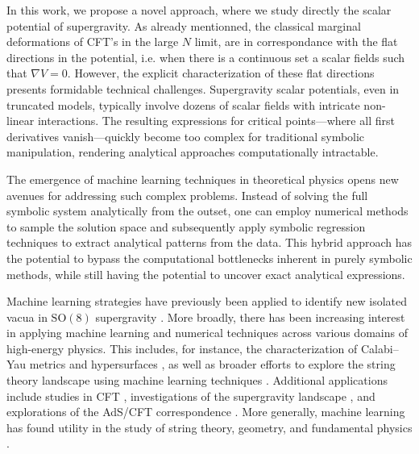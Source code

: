 \documentclass[11pt,a4paper]{article}
\begin{document}
In this work, we propose a novel approach, where we study directly the scalar potential of supergravity. As already mentionned, the classical marginal deformations of CFT's in the large $N$ limit, are in correspondance with the flat directions in the potential, i.e. when there is a continuous set a scalar fields such that $\nabla V = 0$. However, the explicit characterization of these flat directions presents formidable technical challenges. Supergravity scalar potentials, even in truncated models, typically involve dozens of scalar fields with intricate non-linear interactions. The resulting expressions for critical points—where all first derivatives vanish—quickly become too complex for traditional symbolic manipulation, rendering analytical approaches computationally intractable. 

The emergence of machine learning techniques in theoretical physics opens new avenues for addressing such complex problems. Instead of solving the full symbolic system analytically from the outset, one can employ numerical methods to sample the solution space and subsequently apply symbolic regression techniques to extract analytical patterns from the data. This hybrid approach has the potential to bypass the computational bottlenecks inherent in purely symbolic methods, while still having the potential to uncover exact analytical expressions.

Machine learning strategies have previously been applied to identify new isolated vacua in $\mathrm{SO}(8)$ supergravity \cite{Comsa:2019rcz,Berman:2022jqn}. More broadly, there has been increasing interest in applying machine learning and numerical techniques across various domains of high-energy physics. This includes, for instance, the characterization of Calabi–Yau metrics and hypersurfaces \cite{Ashmore:2019wzb,Berman:2021mcw,Larfors:2022nep,Berglund:2022gvm,Jejjala:2020wcc,Douglas:2006rr,Larfors:2021pbb,He:2018jtw}, as well as broader efforts to explore the string theory landscape using machine learning techniques \cite{He:2017aed,Carifio:2017bov,Ruehle:2017mzq}. Additional applications include studies in CFT \cite{Chen:2020dxg}, investigations of the supergravity landscape \cite{Brady:2025zzi,Krishnan:2020sfg}, and explorations of the AdS/CFT correspondence \cite{Hashimoto:2018ftp}. More generally, machine learning has found utility in the study of string theory, geometry, and fundamental physics \cite{Ruehle:2020jrk,He:2023csq,Bao:2021auj}.
\end{document}
